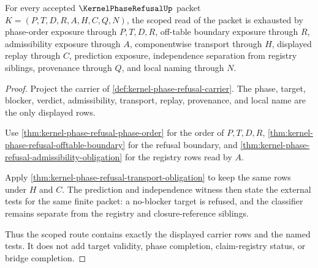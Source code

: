\begin{theorem}
\label{thm:kernel-phase-refusal-scope-closure}
For every accepted $\KernelPhaseRefusalUp$ packet $K=(P,T,D,R,A,H,C,Q,N)$, the scoped read of the packet is exhausted by phase-order exposure through $P,T,D,R$, off-table boundary exposure through $R$, admissibility exposure through $A$, componentwise transport through $H$, displayed replay through $C$, prediction exposure, independence separation from registry siblings, provenance through $Q$, and local naming through $N$.
\end{theorem}
\begin{proof}
Project the carrier of \autoref{def:kernel-phase-refusal-carrier}. The phase, target, blocker, verdict, admissibility, transport, replay, provenance, and local name are the only displayed rows.

Use \autoref{thm:kernel-phase-refusal-phase-order} for the order of $P,T,D,R$, \autoref{thm:kernel-phase-refusal-offtable-boundary} for the refusal boundary, and \autoref{thm:kernel-phase-refusal-admissibility-obligation} for the registry rows read by $A$.

Apply \autoref{thm:kernel-phase-refusal-transport-obligation} to keep the same rows under $H$ and $C$. The prediction and independence witness then state the external tests for the same finite packet: a no-blocker target is refused, and the classifier remains separate from the registry and closure-reference siblings.

Thus the scoped route contains exactly the displayed carrier rows and the named tests. It does not add target validity, phase completion, claim-registry status, or bridge completion.
\end{proof}


